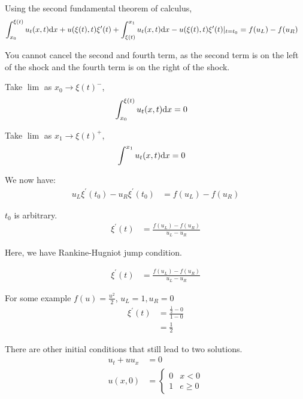   Using the second fundamental theorem of calculus,
  \begin{align}
    \int^{\xi(t)}_{x_0} u_t(x, t) \text dx + u(\xi(t), t) \xi^\prime(t) + \int^{x_1}_{\xi(t)} u_t(x, t) \text dx - u(\xi(t), t)\xi^\prime(t)|_{t = t_0} & = f(u_L) - f(u_R)
  \end{align}

  You cannot cancel the second and fourth term, as the second term is on the left of the shock and the fourth term is on the right of the shock.

  Take $\lim$ as $x_0 \to \xi(t)^-$,
  \begin{align}
    \int^{\xi(t)}_{x_0} u_t(x, t) \text dx & = 0
  \end{align}

  Take $\lim$ as $x_1 \to \xi(t)^+$,
  \begin{align}
    \int^{x_1} u_t(x, t) \text dx & = 0
  \end{align}

  We now have:
  \begin{align}
    u_L \xi^\prime(t_0) - u_R \xi^\prime(t_0) & = f(u_L) - f(u_R)
  \end{align}

  $t_0$ is arbitrary.
  \begin{align}
    \xi^\prime(t) & = \frac{f(u_L) - f(u_R)}{u_L - u_R}
  \end{align}

  Here, we have Rankine-Hugniot jump condition.

  \begin{align}
    \xi^\prime(t) & = \frac{f(u_L) - f(u_R)}{u_L - u_R}
  \end{align}

  For some example $f(u) = \frac{u^2}{2}$, $u_L = 1, u_R = 0$
  \begin{align}
    \xi^\prime(t) & = \frac{\frac{1}{2} - 0}{1 - 0}\\
    & = \frac{1}{2}
  \end{align}

  There are other initial conditions that still lead to two solutions.
  \begin{align}
    u_t + uu_x & = 0\\
    u(x, 0) & =
    \begin{cases}
      0 & x < 0\\
      1 & e \geq 0
    \end{cases}
  \end{align}

